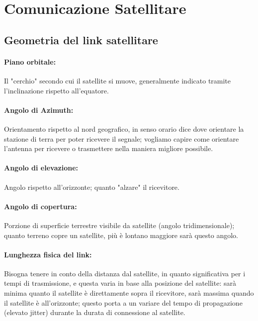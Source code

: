 \section{Comunicazione Satellitare}

\subsection{Geometria del link satellitare}

\paragraph{Piano orbitale:} Il "cerchio" secondo cui il satellite si muove, generalmente indicato tramite l'inclinazione rispetto all'equatore.

\paragraph{Angolo di Azimuth:} Orientamento rispetto al nord geografico, in senso orario dice dove orientare la stazione di terra per poter ricevere il segnale; vogliamo capire come orientare l'antenna per ricevere o trasmettere nella maniera migliore possibile.

\paragraph{Angolo di elevazione:} Angolo rispetto all'orizzonte; quanto "alzare" il ricevitore.

\paragraph{Angolo di copertura:} Porzione di superficie terrestre visibile da satellite (angolo tridimensionale); quanto terreno copre un satellite, più è lontano maggiore sarà questo angolo.

\paragraph{Lunghezza fisica del link:} Bisogna tenere in conto della distanza dal satellite, in quanto significativa per i tempi di trasmissione, e questa varia in base alla posizione del satellite: sarà minima quanto il satellite è direttamente sopra il ricevitore, sarà massima quando il satellite è all'orizzonte; questo porta a un variare del tempo di propagazione (elevato jitter) durante la durata di connessione al satellite.

